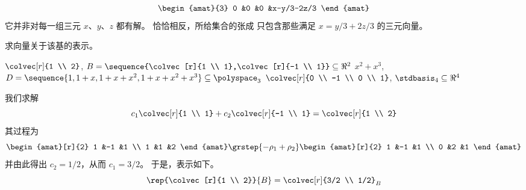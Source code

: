 \begin{exercises}
\begin{answer}
\begin{exparts}
\begin{equation*}
\begin{amat}{3}
              0  &0  &0  &x-y/3-2z/3
            \end{amat}
          \end{equation*}
          它并非对每一组三元 $x$、$y$、$z$ 都有解。
          恰恰相反，所给集合的张成
          只包含那些满足 \( x=y/3+2z/3 \) 的三元向量。
      \end{exparts}
     \end{answer}
  \recommended \item
    求向量关于该基的表示。
    \begin{exparts}
      \partsitem \( \colvec[r]{1 \\ 2} \),
        \( B=\sequence{\colvec[r]{1 \\ 1},\colvec[r]{-1 \\ 1}}\subseteq\Re^2 \)
      \partsitem \( x^2+x^3 \),
        \( D=\sequence{1,1+x,1+x+x^2,1+x+x^2+x^3}\subseteq\polyspace_3 \)
      \partsitem \( \colvec[r]{0 \\ -1 \\ 0 \\ 1} \),
        \( \stdbasis_4\subseteq\Re^4 \)
    \end{exparts}
    \begin{answer}
      \begin{exparts}
        \partsitem 我们求解
          \begin{equation*}
            c_1\colvec[r]{1 \\ 1}
            +c_2\colvec[r]{-1 \\ 1}
            =\colvec[r]{1 \\ 2}
          \end{equation*}
          其过程为
          \begin{equation*}
             \begin{amat}[r]{2}
               1  &-1  &1  \\
               1  &1   &2
             \end{amat}
             \grstep{-\rho_1+\rho_2}
             \begin{amat}[r]{2}
               1  &-1  &1  \\
               0  &2   &1
             \end{amat}
          \end{equation*}
          并由此得出 \( c_2=1/2 \)，从而 \( c_1=3/2 \)。
          于是，表示如下。
          \begin{equation*}
            \rep{\colvec[r]{1 \\ 2}}{B}=\colvec[r]{3/2 \\ 1/2}_B

\end{equation*}
\end{exparts}
\end{answer}
\end{exercises}
